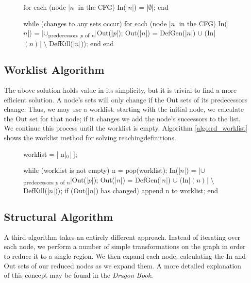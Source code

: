 \documentclass[bsc,twoside,singlespacing,parskip,logo,notimes,normalheadings]{infthesis}
\begin{document}
        \begin{figure}[h]
          \begin{algorithm}[caption={Iterative Round-Robin Method for Reaching Definitions}, label={algo:rd_iterative},escapeinside={||},mathescape=true]
for each (node |$n$| in the CFG)
    In(|$n$|) = |$\emptyset$|;
end

while (changes to any sets occur)
    for each (node |$n$| in the CFG)
        In(|$n$|)  = |$\cup$\textsubscript{predecessors $p$ of $n$}|Out(|$p$|);
        Out(|$n$|) = DefGen(|$n$|) $\cup$ (In|$(n)$| $\setminus$ DefKill(|$n$|));
    end
end
          \end{algorithm}
        \end{figure}

        \subsection{Worklist Algorithm}
        The above solution holds value in its simplicity, but it is
        trivial to find a more efficient solution. A node's sets will
        only change if the Out sets of its predecessors change. Thus,
        we may use a worklist: starting with the initial node, we
        calculate the Out set for that node; if it changes we add the
        node's successors to the list. We continue this process until
        the worklist is empty. Algorithm \ref{algo:rd_worklist} shows
        the worklist method for solving \gls{reachingdefinition}s.

        \begin{figure}[h]
          \begin{algorithm}[caption={Worklist  Method for Reaching Definitions}, label={algo:rd_worklist},escapeinside={||},mathescape=true]
worklist = [ n|$_{0}$| ];

while (worklist is not empty)
    n = pop(worklist);
    In(|$n$|)  = |$\cup$\textsubscript{predecessors $p$ of $n$}|Out(|$p$|);
    Out(|$n$|) = DefGen(|$n$|) $\cup$ (In|$(n)$| $\setminus$ DefKill(|$n$|));
    if (Out(|$n$|) has changed) append n to worklist;
end
          \end{algorithm}
        \end{figure}

        \subsection{Structural Algorithm}
        A third algorithm takes an entirely different
        approach. Instead of iterating over each node, we perform a
        number of simple transformations on the graph in order to
        reduce it to a single \gls{region}. We then expand each node,
        calculating the In and Out sets of our reduced nodes as we
        expand them. A more detailed explanation of this concept may
        be found in the {\em Dragon Book}\cite[p. 673]{dragonbook}.
\end{document}
